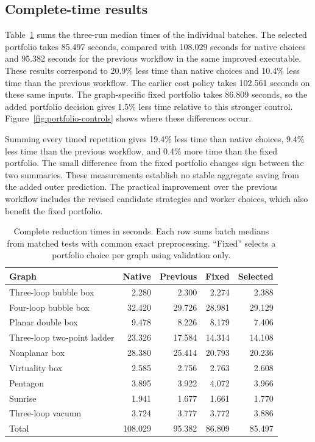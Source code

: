 \subsection{Complete-time results}
Table~\ref{tab:portfolio} sums the three-run median times of the individual batches. The selected portfolio takes 85.497 seconds, compared with 108.029 seconds for native choices and 95.382 seconds for the previous workflow in the same improved executable. These results correspond to 20.9\% less time than native choices and 10.4\% less time than the previous workflow. The earlier cost policy takes 102.561 seconds on these same inputs. The graph-specific fixed portfolio takes 86.809 seconds, so the added portfolio decision gives 1.5\% less time relative to this stronger control. Figure~\ref{fig:portfolio-controls} shows where these differences occur.

Summing every timed repetition gives 19.4\% less time than native choices, 9.4\% less time than the previous workflow, and 0.4\% more time than the fixed portfolio. The small difference from the fixed portfolio changes sign between the two summaries. These measurements establish no stable aggregate saving from the added outer prediction. The practical improvement over the previous workflow includes the revised candidate strategies and worker choices, which also benefit the fixed portfolio.

\begin{table}[!htbp]\centering\small
\caption{Complete reduction times in seconds. Each row sums batch medians from matched tests with common exact preprocessing. ``Fixed'' selects a portfolio choice per graph using validation only.}
\label{tab:portfolio}
\begin{tabular}{@{}lrrrr@{}}\toprule
Graph & Native & Previous & Fixed & Selected\\\midrule
Three-loop bubble box & 2.280 & 2.300 & 2.274 & 2.388\\
Four-loop bubble box & 32.420 & 29.726 & 28.981 & 29.129\\
Planar double box & 9.478 & 8.226 & 8.179 & 7.406\\
Three-loop two-point ladder & 23.326 & 17.584 & 14.314 & 14.108\\
Nonplanar box & 28.380 & 25.414 & 20.793 & 20.236\\
Virtuality box & 2.585 & 2.756 & 2.763 & 2.608\\
Pentagon & 3.895 & 3.922 & 4.072 & 3.966\\
Sunrise & 1.941 & 1.677 & 1.661 & 1.770\\
Three-loop vacuum & 3.724 & 3.777 & 3.772 & 3.886\\
\midrule Total & 108.029 & 95.382 & 86.809 & 85.497\\\bottomrule
\end{tabular}\end{table}

